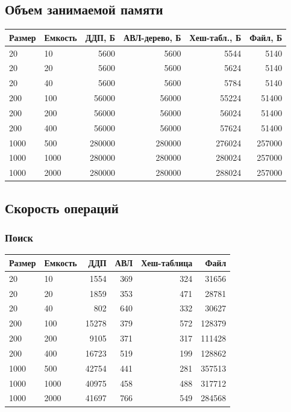 \documentclass[a4paper,12pt]{extarticle}
\begin{document}
\subsection{Объем занимаемой памяти}


\begin{tabular}{ |l|l|r|r|r|r| }
\hline
\textbf{Размер} & \textbf{Емкость} & \textbf{ДДП, Б} & \textbf{АВЛ-дерево, Б} & \textbf{Хеш-табл., Б} & \textbf{Файл, Б} \\ \hline
20 & 10 & 5600 & 5600 & 5544 & 5140 \\ \hline
20 & 20 & 5600 & 5600 & 5624 & 5140 \\ \hline
20 & 40 & 5600 & 5600 & 5784 & 5140 \\ \hline
200 & 100 & 56000 & 56000 & 55224 & 51400 \\ \hline
200 & 200 & 56000 & 56000 & 56024 & 51400 \\ \hline
200 & 400 & 56000 & 56000 & 57624 & 51400 \\ \hline
1000 & 500 & 280000 & 280000 & 276024 & 257000 \\ \hline
1000 & 1000 & 280000 & 280000 & 280024 & 257000 \\ \hline
1000 & 2000 & 280000 & 280000 & 288024 & 257000 \\ \hline
\end{tabular}

\subsection{Скорость операций}

\subsubsection{Поиск}

\begin{tabular}{ |l|l|r|r|r|r| }
\hline
\textbf{Размер} & \textbf{Емкость} & \textbf{ДДП} & \textbf{АВЛ} & \textbf{Хеш-таблица} & \textbf{Файл} \\ \hline
20 & 10 & 1554 & 369 & 324 & 31656 \\ \hline
20 & 20 & 1859 & 353 & 471 & 28781 \\ \hline
20 & 40 & 802 & 640 & 332 & 30627 \\ \hline
200 & 100 & 15278 & 379 & 572 & 128379 \\ \hline
200 & 200 & 9105 & 371 & 317 & 111428 \\ \hline
200 & 400 & 16723 & 519 & 199 & 128862 \\ \hline
1000 & 500 & 42754 & 441 & 281 & 357513 \\ \hline
1000 & 1000 & 40975 & 458 & 488 & 317712 \\ \hline
1000 & 2000 & 41697 & 766 & 549 & 284568 \\ \hline
\end{tabular}
\end{document}
